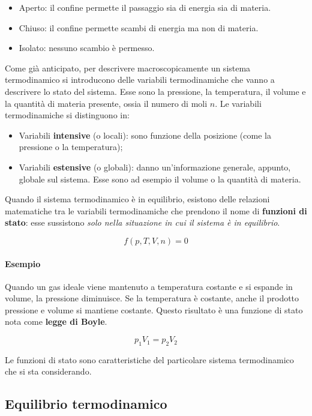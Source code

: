 \begin{itemize}
	\item Aperto: il confine permette il passaggio sia di energia sia di materia.
	\item Chiuso: il confine permette scambi di energia ma non di materia.
	\item Isolato: nessuno scambio è permesso.
\end{itemize}

Come già anticipato, per descrivere macroscopicamente un sistema termodinamico si introducono delle variabili termodinamiche che vanno a descrivere lo stato del sistema. Esse sono la pressione, la temperatura, il volume e la quantità di materia presente, ossia il numero di moli $n$.
Le variabili termodinamiche si distinguono in:

\begin{itemize}
	\item Variabili \textbf{intensive} (o locali): sono funzione della posizione (come la pressione o la temperatura);
	\item Variabili \textbf{estensive} (o globali): danno un'informazione generale, appunto, globale sul sistema. Esse sono ad esempio il volume o la quantità di materia.
\end{itemize}

Quando il sistema termodinamico è in equilibrio, esistono delle relazioni matematiche tra le variabili termodinamiche che prendono il nome di \textbf{funzioni di stato}: esse sussistono \emph{solo nella situazione in cui il sistema è in equilibrio}.

\[
	f(p,T,V,n) = 0
\]

\paragraph{Esempio} Quando un gas ideale viene mantenuto a temperatura costante e si espande in volume, la pressione diminuisce. Se la temperatura è costante, anche il prodotto pressione e volume si mantiene costante. Questo risultato è una funzione di stato nota come \textbf{legge di Boyle}.

\[
	p_1 V_1=p_2 V_2
\]

Le funzioni di stato sono caratteristiche del particolare sistema termodinamico che si sta considerando.

\subsection{Equilibrio termodinamico}


